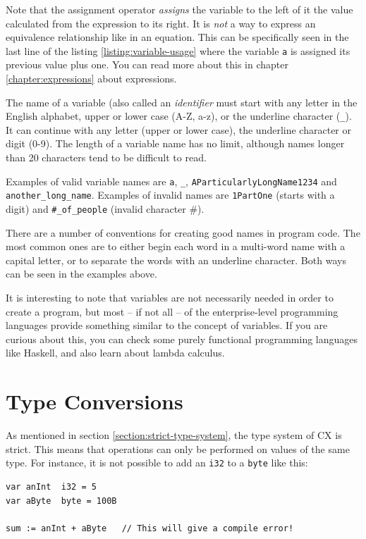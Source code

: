 \documentclass[11pt,fleqn,openany]{book} %
\begin{document}
Note that the assignment operator \emph{assigns} the variable to the left of it the value calculated from the expression to its right. It is \emph{not} a way to express an equivalence relationship like in an equation. This can be specifically seen in the last line of the listing \ref{listing:variable-usage} where the variable \texttt{a} is assigned its previous value plus one. You can read more about this in chapter \ref{chapter:expressions} about expressions.

The name of a variable (also called an \textit{identifier} must start with any letter in the English alphabet, upper or lower case (A-Z, a-z), or the underline character (\texttt{\_}). It can continue with any letter (upper or lower case), the underline character or digit (0-9).  The length of a variable name has no limit, although names longer than 20 characters tend to be difficult to read.

Examples of valid variable names are \texttt{a}, \texttt{\_}, \texttt{AParticularlyLongName1234} and \texttt{another\_long\_name}. Examples of invalid names are \texttt{1PartOne} (starts with a digit) and \texttt{\#\_of\_people} (invalid character \#).

There are a number of conventions for creating good names in program code. The most common ones are to either begin each word in a multi-word name with a capital letter, or to separate the words with an underline character. Both ways can be seen in the examples above.

It is interesting to note that variables are not necessarily needed in order to create a program, but most -- if not all -- of the enterprise-level programming languages provide something similar to the concept of variables. If you are curious about this, you can check some purely functional programming languages like Haskell, and also learn about lambda calculus.

\section{Type Conversions}

As mentioned in section \ref{section:strict-type-system}, the type system of CX is strict.  This means that operations can only be performed on values of the same type. For instance, it is not possible to add an \texttt{i32} to a \texttt{byte} like this:

\begin{lstlisting}
var anInt  i32 = 5
var aByte  byte = 100B

sum := anInt + aByte   // This will give a compile error!
\end{lstlisting}
\end{document}
